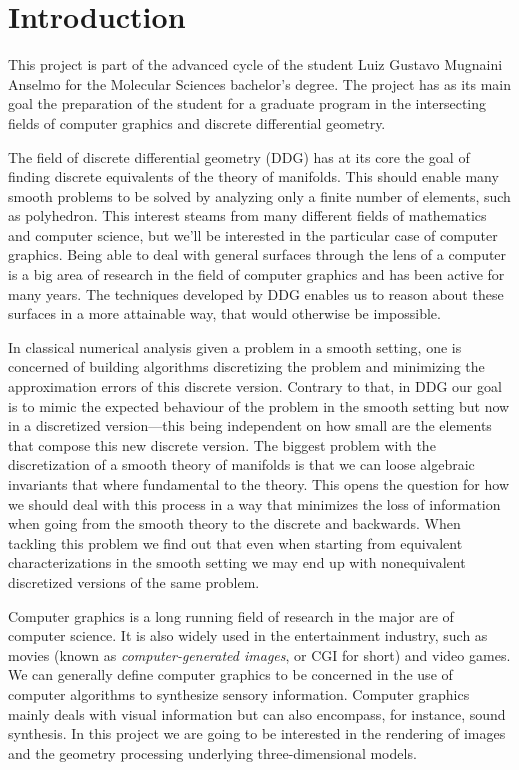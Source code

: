 \documentclass[11pt,reqno]{amsart}
\theoremstyle{definition}
\begin{document}
\maketitle


\section{Introduction}\label{sec:intro}

This project is part of the advanced cycle of the student Luiz Gustavo Mugnaini Anselmo for the
Molecular Sciences bachelor's degree. The project has as its main goal the preparation of the
student for a graduate program in the intersecting fields of computer graphics and discrete
differential geometry.

The field of discrete differential geometry (DDG) has at its core the goal of finding discrete
equivalents of the theory of manifolds. This should enable many smooth problems to be solved by
analyzing only a finite number of elements, such as polyhedron. This interest steams from many
different fields of mathematics and computer science, but we'll be interested in the particular case
of computer graphics. Being able to deal with general surfaces through the lens of a computer is a
big area of research in the field of computer graphics and has been active for many years. The
techniques developed by DDG enables us to reason about these surfaces in a more attainable way, that
would otherwise be impossible.

In classical numerical analysis given a problem in a smooth setting, one is concerned of building
algorithms discretizing the problem and minimizing the approximation errors of this discrete
version. Contrary to that, in DDG our goal is to mimic the expected behaviour of the problem in the
smooth setting but now in a discretized version---this being independent on how small are the
elements that compose this new discrete version. The biggest problem with the discretization of a
smooth theory of manifolds is that we can loose algebraic invariants that where fundamental to the
theory. This opens the question for how we should deal with this process in a way that minimizes the
loss of information when going from the smooth theory to the discrete and backwards. When tackling
this problem we find out that even when starting from equivalent characterizations in the smooth
setting we may end up with nonequivalent discretized versions of the same problem.

Computer graphics is a long running field of research in the major are of computer science. It is
also widely used in the entertainment industry, such as movies (known as \emph{computer-generated
images}, or CGI for short) and video games. We can generally define computer graphics to be
concerned in the use of computer algorithms to synthesize sensory information. Computer graphics
mainly deals with visual information but can also encompass, for instance, sound synthesis. In this
project we are going to be interested in the rendering of images and the geometry processing
underlying three-dimensional models.
\end{document}
